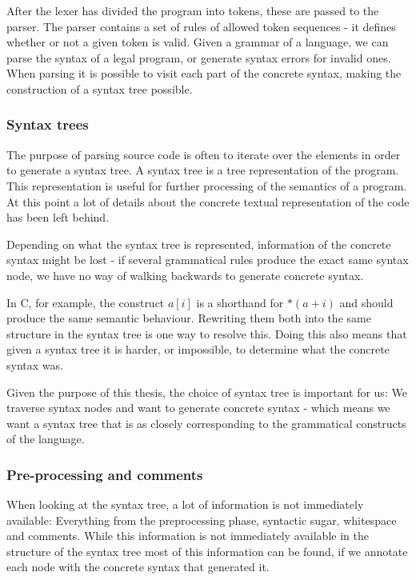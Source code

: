 \documentclass[11pt]{article}
\begin{document}
After the lexer has divided the program into tokens, these are passed to the parser. The parser contains a set of rules of allowed token sequences - it defines whether or not a given token is valid. Given a grammar of a language, we can parse the syntax of a legal program, or generate syntax errors for invalid ones. When parsing it is possible to visit each part of the concrete syntax, making the construction of a syntax tree possible.

\subsubsection{Syntax trees}
The purpose of parsing source code is often to iterate over the elements in order to generate a syntax tree. A syntax tree is a tree representation of the program. This representation is useful for further processing of the semantics of a program. At this point a lot of details about the concrete textual representation of the code has been left behind.

Depending on what the syntax tree is represented, information of the concrete syntax might be lost - if several grammatical rules produce the exact same syntax node, we have no way of walking backwards to generate concrete syntax.

In C, for example, the construct $a[i]$ is a shorthand for $*(a + i)$ and should produce the same semantic behaviour. Rewriting them both into the same structure in the syntax tree is one way to resolve this. Doing this also means that given a syntax tree it is harder, or impossible, to determine what the concrete syntax was.

Given the purpose of this thesis, the choice of syntax tree is important for us: We traverse syntax nodes and want to generate concrete syntax - which means we want a syntax tree that is as closely corresponding to the grammatical constructs of the language.

\subsubsection{Pre-processing and comments}
\label{PreprocessComments}
When looking at the syntax tree, a lot of information is not immediately available: Everything from the preprocessing phase, syntactic sugar, whitespace and comments. While this information is not immediately available in the structure of the syntax tree most of this information can be found, if we annotate each node with the concrete syntax that generated it. 
\end{document}
